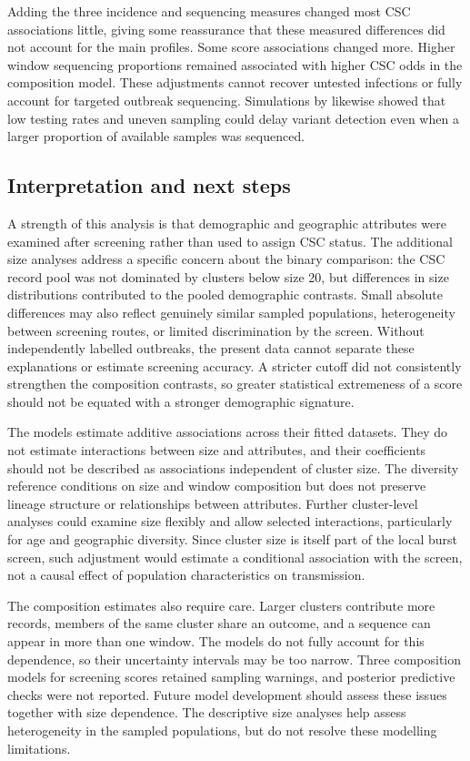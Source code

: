 Adding the three incidence and sequencing measures changed most CSC associations little, giving some reassurance that these measured differences did not account for the main profiles. Some score associations changed more. Higher window sequencing proportions remained associated with higher CSC odds in the composition model. These adjustments cannot recover untested infections or fully account for targeted outbreak sequencing. Simulations by \citet{Han2023} likewise showed that low testing rates and uneven sampling could delay variant detection even when a larger proportion of available samples was sequenced.

\subsection{Interpretation and next steps}\label{sec:ch6_discussion_implications}

A strength of this analysis is that demographic and geographic attributes were examined after screening rather than used to assign CSC status. The additional size analyses address a specific concern about the binary comparison: the CSC record pool was not dominated by clusters below size 20, but differences in size distributions contributed to the pooled demographic contrasts. Small absolute differences may also reflect genuinely similar sampled populations, heterogeneity between screening routes, or limited discrimination by the screen. Without independently labelled outbreaks, the present data cannot separate these explanations or estimate screening accuracy. A stricter cutoff did not consistently strengthen the composition contrasts, so greater statistical extremeness of a score should not be equated with a stronger demographic signature.

The models estimate additive associations across their fitted datasets. They do not estimate interactions between size and attributes, and their coefficients should not be described as associations independent of cluster size. The diversity reference conditions on size and window composition but does not preserve lineage structure or relationships between attributes. Further cluster-level analyses could examine size flexibly and allow selected interactions, particularly for age and geographic diversity. Since cluster size is itself part of the local burst screen, such adjustment would estimate a conditional association with the screen, not a causal effect of population characteristics on transmission.

The composition estimates also require care. Larger clusters contribute more records, members of the same cluster share an outcome, and a sequence can appear in more than one window. The models do not fully account for this dependence, so their uncertainty intervals may be too narrow. Three composition models for screening scores retained sampling warnings, and posterior predictive checks were not reported. Future model development should assess these issues together with size dependence. The descriptive size analyses help assess heterogeneity in the sampled populations, but do not resolve these modelling limitations.

